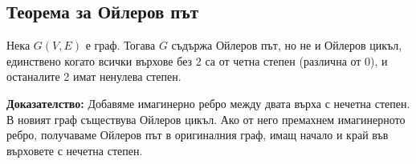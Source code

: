\documentclass[fleqn,12pt]{article}
\begin{document}
\begin{flushleft}
\subsection{Теорема за Ойлеров път} 
Нека $G(V,E)$ е граф. Тогава $G$ съдържа Ойлеров път, но не и Ойлеров цикъл, единствено когато
всички върхове без 2 са от четна степен (различна от 0), и останалите 2 имат ненулева степен.

\textbf{Доказателство: } Добавяме имагинерно ребро между двата върха с нечетна степен. В новият граф съществува Ойлеров цикъл.
Ако от него премахнем имагинерното ребро, получаваме Ойлеров път в оригиналния граф, имащ начало и край във върховете с нечетна степен.

\end{flushleft}
\end{document}
